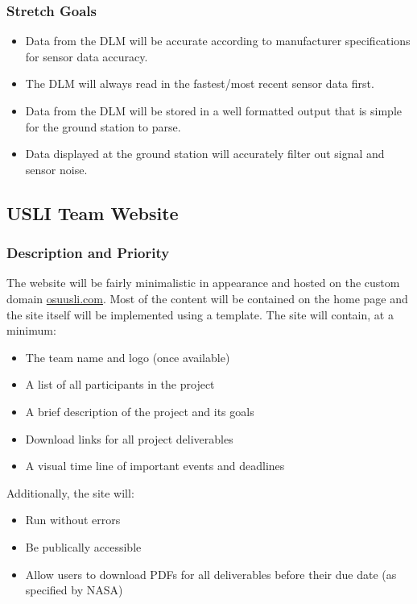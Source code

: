 \documentclass[onecolumn, draftclsnofoot, 10pt, compsoc]{IEEEtran}
\begin{document}
\subsubsection{Stretch Goals}
\begin{itemize}
\item Data from the DLM will be accurate according to manufacturer specifications for sensor data accuracy.
\item The DLM will always read in the fastest/most recent sensor data first.
\item Data from the DLM will be stored in a well formatted output that is simple for the ground station to parse.
\item Data displayed at the ground station will accurately filter out signal and sensor noise.
\end{itemize}


\subsection{USLI Team Website}
\subsubsection{Description and Priority}
The website will be fairly minimalistic in appearance and hosted on the custom domain \href{http://osuusli.com/}{osuusli.com}. Most of the content will be contained on the home page and the site itself will be implemented using a template. The site will contain, at a minimum:
\begin{itemize}
\item The team name and logo (once available)
\item A list of all participants in the project
\item A brief description of the project and its goals
\item Download links for all project deliverables
\item A visual time line of important events and deadlines
\end{itemize}
Additionally, the site will:
\begin{itemize}
\item Run without errors
\item Be publically accessible
\item Allow users to download PDFs for all deliverables before their due date (as specified by NASA)
\end{itemize}
\end{document}
